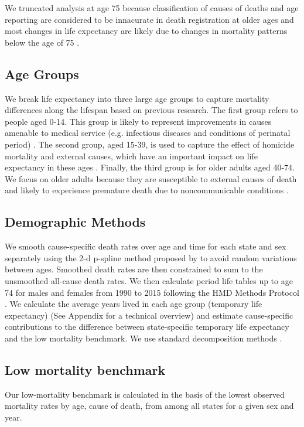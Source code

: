 \documentclass[11.5pt]{article}
\begin{document}
\begin{spacing}{1.5}
We truncated analysis at age 75 because classification of causes of deaths and age reporting are considered to be innacurate in death registration at older ages \citep{tobias2001} and most changes in life expectancy are likely due to changes in mortality patterns below the age of 75 \citep{Aburto2015}. 

\subsection*{Age Groups}

We break life expectancy into three large age groups to capture mortality differences along the lifespan based on previous research. The first group refers to people aged 0-14. This group is likely to represent improvements in causes amenable to medical service (e.g. infectious diseases and conditions of perinatal period) \citep{canudas2014}. The second group, aged 15-39, is used to capture the effect of homicide mortality and external causes, which have an important impact on life expectancy in these ages \citep{Aburto2015}. Finally, the third group is for older adults aged 40-74. 
We focus on older adults because they are susceptible to external causes of death and likely to experience premature death due to noncommunicable conditions \citep{canudas2014}.

\subsection*{Demographic Methods}
We smooth cause-specific death rates over age and time for each
state and sex separately using the 2-d p-spline method proposed by
\citet{GC2012} to avoid random variations between ages. Smoothed death rates are
then constrained to sum to the unsmoothed all-cause death rates. We then calculate period life tables up to
age 74 for males and females from 1990 to 2015 following the HMD Methods
Protocol \citep{HMDMP}. We calculate the average years lived in each age group (temporary life expectancy) \citep{arriaga1984} (See Appendix for a technical overview) and estimate cause-specific contributions to the difference between
state-specific temporary life expectancy and  the low mortality benchmark. We use
 standard decomposition methods \citep{horiuchi2008}.

\subsection*{Low mortality benchmark}
Our low-mortality benchmark is calculated in the basis of the lowest observed mortality rates by age, cause of death, from among all states for a given sex and year.



\end{spacing}
\end{document}
